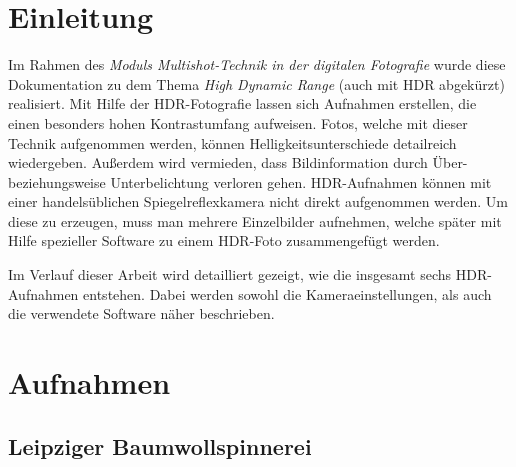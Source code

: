 \documentclass[liststotoc,bibtotoc,fontsize=14pt,]{scrreprt}
\begin{document}
	\chapter{Einleitung}
	\label{ch:einleitung}
	Im Rahmen des \textit{Moduls Multishot-Technik in der digitalen Fotografie} wurde diese Dokumentation zu dem Thema \textit{High Dynamic Range} (auch mit HDR abgekürzt) realisiert. Mit Hilfe der HDR-Fotografie lassen sich Aufnahmen erstellen, die einen besonders hohen Kontrastumfang aufweisen. Fotos, welche mit dieser Technik aufgenommen werden, können Helligkeitsunterschiede detailreich wiedergeben. Außerdem wird vermieden, dass Bildinformation durch Über- beziehungsweise Unterbelichtung verloren gehen. HDR-Aufnahmen können mit  einer handelsüblichen Spiegelreflexkamera nicht direkt aufgenommen werden. Um diese zu erzeugen, muss man mehrere Einzelbilder aufnehmen, welche später mit Hilfe spezieller Software zu einem HDR-Foto zusammengefügt werden.
	
	\bigskip
	Im Verlauf dieser Arbeit wird detailliert gezeigt, wie die insgesamt sechs HDR-Aufnahmen entstehen. Dabei werden sowohl die  Kameraeinstellungen, als auch die verwendete Software näher beschrieben. 
		
	\chapter{Aufnahmen}
	\label{ch:aufnahmen}
	
	\section{Leipziger Baumwollspinnerei}
	\label{sec:spinnerei}
\end{document}
